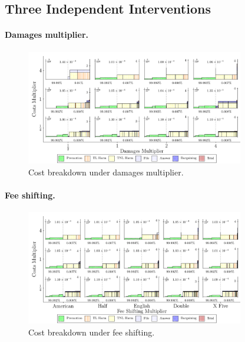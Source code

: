 \documentclass{article}
\begin{document}
\subsection{Three Independent Interventions}

\FloatBarrier
\paragraph{Damages multiplier.}

\begin{figure}[ht]
  \centering
  \includegraphics[width=0.85\textwidth]{../Figures/Cost Breakdown Damages Multiplier (All Rows).pdf}
  \caption{Cost breakdown under damages multiplier.}
  \label{fig:damages_multiplier}
\end{figure}

\FloatBarrier
\paragraph{Fee shifting.}
\begin{figure}[ht]
  \centering
  \includegraphics[width=0.85\textwidth]{../Figures/Cost Breakdown Fee Shifting Multiplier (All Rows).pdf}
  \caption{Cost breakdown under fee shifting.}
  \label{fig:fee_shifting}
\end{figure}

\FloatBarrier
\end{document}
